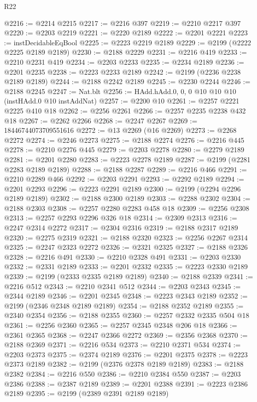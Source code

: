\begin{lexlean}{R22}
\begin{coremodule}
@2216 := @2214 @2215
@2217 := @2216 @397
@2219 := @2210 @2217 @397
@2220 := @2203 @2219
@2221 := @2220 @2189
@2222 := @2201 @2221
@2223 := instDecidableEqBool
@2225 := @2223 @2219 @2189
@2229 := @2199 (@2222 @2225 @2189 @2189)
@2230 := @2188 @2229
@2231 := @2216 @419
@2233 := @2210 @2231 @419
@2234 := @2203 @2233
@2235 := @2234 @2189
@2236 := @2201 @2235
@2238 := @2223 @2233 @2189
@2242 := @2199 (@2236 @2238 @2189 @2189)
@2244 := @2188 @2242 @2189
@2245 := @2230 @2244
@2246 := @2188 @2245
@2247 := Nat.blt
@2256 := HAdd.hAdd.{0, 0, 0} @10 @10 @10 (instHAdd.{0} @10 instAddNat)
@2257 := @2200 @10
@2261 := @2257 @2221 @2225 @410 @18
@2262 := @2256 @2261
@2266 := @2257 @2235 @2238 @432 @18
@2267 := @2262 @2266
@2268 := @2247 @2267
@2269 := 18446744073709551616
@2272 := @13 @2269 (@16 @2269)
@2273 := @2268 @2272
@2274 := @2246 @2273
@2275 := @2188 @2274
@2276 := @2216 @445
@2278 := @2210 @2276 @445
@2279 := @2203 @2278
@2280 := @2279 @2189
@2281 := @2201 @2280
@2283 := @2223 @2278 @2189
@2287 := @2199 (@2281 @2283 @2189 @2189)
@2288 := @2188 @2287
@2289 := @2216 @466
@2291 := @2210 @2289 @466
@2292 := @2203 @2291
@2293 := @2292 @2189
@2294 := @2201 @2293
@2296 := @2223 @2291 @2189
@2300 := @2199 (@2294 @2296 @2189 @2189)
@2302 := @2188 @2300 @2189
@2303 := @2288 @2302
@2304 := @2188 @2303
@2308 := @2257 @2280 @2283 @458 @18
@2309 := @2256 @2308
@2313 := @2257 @2293 @2296 @326 @18
@2314 := @2309 @2313
@2316 := @2247 @2314 @2272
@2317 := @2304 @2316
@2319 := @2188 @2317 @2189
@2320 := @2275 @2319
@2321 := @2188 @2320
@2323 := @2256 @2267 @2314
@2325 := @2247 @2323 @2272
@2326 := @2321 @2325
@2327 := @2188 @2326
@2328 := @2216 @491
@2330 := @2210 @2328 @491
@2331 := @2203 @2330
@2332 := @2331 @2189
@2333 := @2201 @2332
@2335 := @2223 @2330 @2189
@2339 := @2199 (@2333 @2335 @2189 @2189)
@2340 := @2188 @2339
@2341 := @2216 @512
@2343 := @2210 @2341 @512
@2344 := @2203 @2343
@2345 := @2344 @2189
@2346 := @2201 @2345
@2348 := @2223 @2343 @2189
@2352 := @2199 (@2346 @2348 @2189 @2189)
@2354 := @2188 @2352 @2189
@2355 := @2340 @2354
@2356 := @2188 @2355
@2360 := @2257 @2332 @2335 @504 @18
@2361 := @2256 @2360
@2365 := @2257 @2345 @2348 @206 @18
@2366 := @2361 @2365
@2368 := @2247 @2366 @2272
@2369 := @2356 @2368
@2370 := @2188 @2369
@2371 := @2216 @534
@2373 := @2210 @2371 @534
@2374 := @2203 @2373
@2375 := @2374 @2189
@2376 := @2201 @2375
@2378 := @2223 @2373 @2189
@2382 := @2199 (@2376 @2378 @2189 @2189)
@2383 := @2188 @2382
@2384 := @2216 @550
@2386 := @2210 @2384 @550
@2387 := @2203 @2386
@2388 := @2387 @2189
@2389 := @2201 @2388
@2391 := @2223 @2386 @2189
@2395 := @2199 (@2389 @2391 @2189 @2189)

\end{coremodule}
\end{lexlean}
